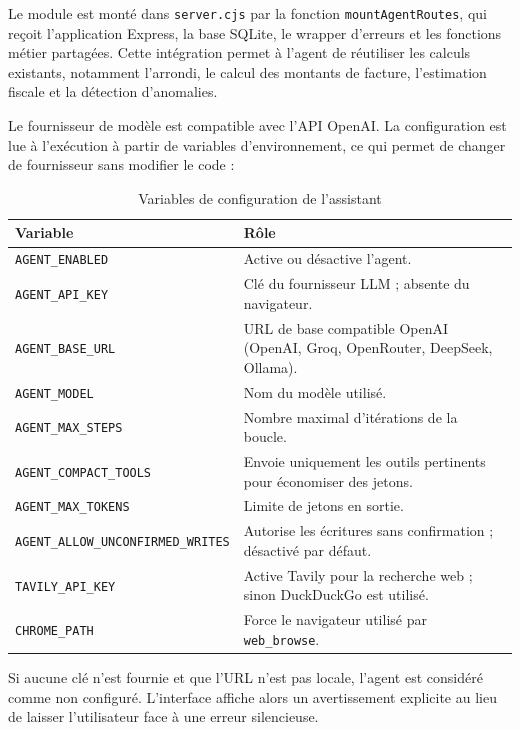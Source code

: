 \documentclass[12pt,a4paper,oneside]{report}
\newcommand{\code}[1]{\texttt{#1}}
\begin{document}
Le module est monté dans \code{server.cjs} par la fonction \code{mountAgentRoutes}, qui reçoit l'application Express, la base SQLite, le wrapper d'erreurs et les fonctions métier partagées. Cette intégration permet à l'agent de réutiliser les calculs existants, notamment l'arrondi, le calcul des montants de facture, l'estimation fiscale et la détection d'anomalies.

Le fournisseur de modèle est compatible avec l'API OpenAI. La configuration est lue à l'exécution à partir de variables d'environnement, ce qui permet de changer de fournisseur sans modifier le code :

\begin{table}[H]\centering
\caption{Variables de configuration de l'assistant}
\begin{tabularx}{\textwidth}{p{6.2cm}Y}
\toprule \textbf{Variable} & \textbf{Rôle}\\ \midrule
\code{\small AGENT\_ENABLED} & Active ou désactive l'agent.\\
\code{\small AGENT\_API\_KEY} & Clé du fournisseur LLM ; absente du navigateur.\\
\code{\small AGENT\_BASE\_URL} & URL de base compatible OpenAI (OpenAI, Groq, OpenRouter, DeepSeek, Ollama).\\
\code{\small AGENT\_MODEL} & Nom du modèle utilisé.\\
\code{\small AGENT\_MAX\_STEPS} & Nombre maximal d'itérations de la boucle.\\
\code{\small AGENT\_COMPACT\_TOOLS} & Envoie uniquement les outils pertinents pour économiser des jetons.\\
\code{\small AGENT\_MAX\_TOKENS} & Limite de jetons en sortie.\\
\code{\scriptsize AGENT\_ALLOW\_UNCONFIRMED\_WRITES} & Autorise les écritures sans confirmation ; désactivé par défaut.\\
\code{\small TAVILY\_API\_KEY} & Active Tavily pour la recherche web ; sinon DuckDuckGo est utilisé.\\
\code{\small CHROME\_PATH} & Force le navigateur utilisé par \code{web\_browse}.\\
\bottomrule
\end{tabularx}
\end{table}

Si aucune clé n'est fournie et que l'URL n'est pas locale, l'agent est considéré comme non configuré. L'interface affiche alors un avertissement explicite au lieu de laisser l'utilisateur face à une erreur silencieuse.
\end{document}
